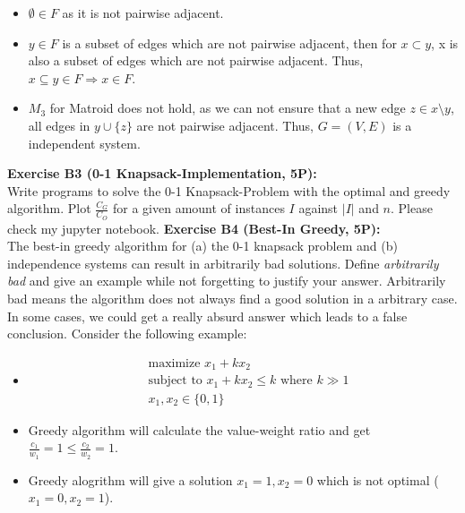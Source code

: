 \documentclass[12pt]{article}
\theoremstyle{definition}
\begin{document}
\begin{flushleft}
\begin{enumerate}[(a)]
    \begin{itemize}
        \item $\emptyset \in F$ as it is not pairwise adjacent.
        \item $y \in F$ is a subset of edges which are not pairwise adjacent,
        then for $x \subset y$, x is also a subset of edges which are not pairwise adjacent.
        Thus, $x \subseteq y \in F \Longrightarrow x \in F$.
        \item $M_3$ for Matroid does not hold, as we can not ensure that a new edge $z \in x \setminus y$,
        all edges in $y \cup \{z\}$ are not pairwise adjacent. Thus, $G = (V,E)$ is a independent system.  
    \end{itemize}
\end{enumerate}
\textbf{Exercise B3 (0-1 Knapsack-Implementation, 5P):} \\
Write programs to solve the 0-1 Knapsack-Problem with the optimal and greedy algorithm. Plot
$\frac{C_G}{C_O}$ for a given amount of instances $I$ against $|I|$ and $n$.
\newline
Please check my jupyter notebook.
\newline
\textbf{Exercise B4 (Best-In Greedy, 5P):} \\
The best-in greedy algorithm for (a) the 0-1 knapsack problem and (b) independence systems can
result in arbitrarily bad solutions. Define \textit{arbitrarily bad} and give an example while not forgetting
to justify your answer.
\newline
Arbitrarily bad means the algorithm does not always find a good solution in a arbitrary case. In some cases, we could get
a really absurd answer which leads to a false conclusion.
\newline
Consider the following example:
\begin{itemize}
    \item 
    \begin{align*}
        & \text{maximize } x_1 + k x_2 \\
        & \text{subject to } x_1 + k x_2 \leq k \text{ where } k \gg 1 \\
        & x_1, x_2 \in \{0, 1\}
    \end{align*}
    \item Greedy algorithm will calculate the value-weight ratio and get $\displaystyle\frac{c_1}{w_1} = 1 \leq \displaystyle\frac{c_2}{w_2} = 1$.
    \item Greedy alogrithm will give a solution $x_1 = 1, x_2 = 0$ which is not optimal ($x_1 = 0, x_2 = 1$).

\end{itemize}
\end{flushleft}
\end{document}
